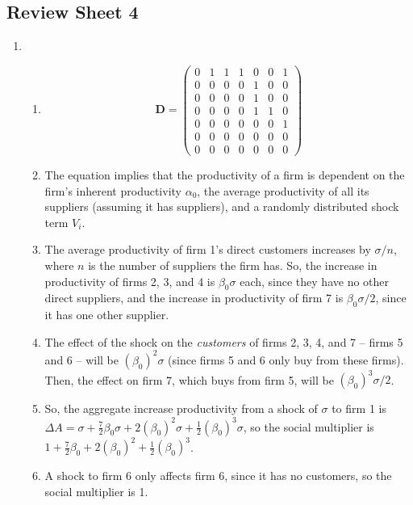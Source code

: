 \documentclass{article}
\begin{document}
\subsection*{Review Sheet 4}

\begin{enumerate}

	\item

	\begin{enumerate}

		\item

		\begin{equation*}
		\mathbf{D} = \begin{pmatrix}
		 0 & 1 & 1 & 1 & 0 & 0 & 1 \\ 
		 0 & 0 & 0 & 0 & 1 & 0 & 0 \\ 
		 0 & 0 & 0 & 0 & 1 & 0 & 0 \\ 
		 0 & 0 & 0 & 0 & 1 & 1 & 0 \\ 
		 0 & 0 & 0 & 0 & 0 & 0 & 1 \\ 
		 0 & 0 & 0 & 0 & 0 & 0 & 0 \\ 
		 0 & 0 & 0 & 0 & 0 & 0 & 0 
		\end{pmatrix}
		\end{equation*}

		\item The equation implies that the productivity of a firm is dependent on the firm's inherent productivity $\alpha_0$, the average productivity of all its suppliers (assuming it has suppliers), and a randomly distributed shock term $V_i$. 

		\item The average productivity of firm 1's direct customers increases by $\sigma/n$, where $n$ is the number of suppliers the firm has. So, the increase in productivity of firms 2, 3, and 4 is $\beta_0 \sigma$ each, since they have no other direct suppliers, and the increase in productivity of firm 7 is $\beta_0 \sigma/2$, since it has one other supplier.

		\item The effect of the shock on the \textit{customers} of firms 2, 3, 4, and 7 -- firms 5 and 6 -- will be $(\beta_0)^2 \sigma$ (since firms 5 and 6 only buy from these firms). Then, the effect on firm 7, which buys from firm 5, will be $(\beta_0)^3 \sigma/2$.

		\item So, the aggregate increase productivity from a shock of $\sigma$ to firm 1 is $\Delta A = \sigma + \frac{7}{2} \beta_0 \sigma + 2 (\beta_0)^2 \sigma + \frac{1}{2}(\beta_0)^3 \sigma$, so the social multiplier is $1 + \frac{7}{2} \beta_0 + 2 (\beta_0)^2 + \frac{1}{2}(\beta_0)^3$.

		\item A shock to firm 6 only affects firm 6, since it has no customers, so the social multiplier is 1. 

	\end{enumerate}

\end{enumerate}
\end{document}
